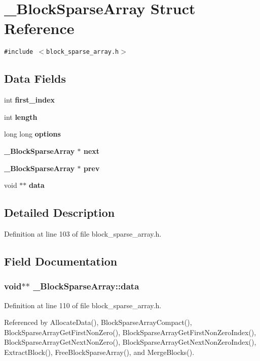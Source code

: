 \section{\_\-Block\-Sparse\-Array Struct Reference}
\label{struct__BlockSparseArray}
{\tt \#include $<$block\_\-sparse\_\-array.h$>$}

\subsection*{Data Fields}
\begin{CompactItemize}
\item 
int \bf{first\_\-index}
\item 
int \bf{length}
\item 
long long \bf{options}
\item 
\bf{\_\-Block\-Sparse\-Array} $\ast$ \bf{next}
\item 
\bf{\_\-Block\-Sparse\-Array} $\ast$ \bf{prev}
\item 
void $\ast$$\ast$ \bf{data}
\end{CompactItemize}


\subsection{Detailed Description}




Definition at line 103 of file block\_\-sparse\_\-array.h.

\subsection{Field Documentation}
\subsubsection{\setlength{\rightskip}{0pt plus 5cm}void$\ast$$\ast$ \bf{\_\-Block\-Sparse\-Array::data}}\label{struct__BlockSparseArray_8be44c6c00632a605925ebe2981ec809}




Definition at line 110 of file block\_\-sparse\_\-array.h.

Referenced by Allocate\-Data(), Block\-Sparse\-Array\-Compact(), Block\-Sparse\-Array\-Get\-First\-Non\-Zero(), Block\-Sparse\-Array\-Get\-First\-Non\-Zero\-Index(), Block\-Sparse\-Array\-Get\-Next\-Non\-Zero(), Block\-Sparse\-Array\-Get\-Next\-Non\-Zero\-Index(), Extract\-Block(), Free\-Block\-Sparse\-Array(), and Merge\-Blocks().
